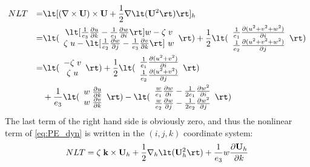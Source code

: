 \documentclass[../main/NEMO_manual]{subfiles}
\begin{document}
\begin{alignat*}{2}
  &NLT &=   &\lt[ (\nabla \times {\vect U}) \times {\vect U} + \frac{1}{2} \nabla \lt( {\vect U}^2 \rt) \rt]_h \\
  &    &=   &\lt(
    \begin{array}{*{20}c}
                \lt[ \frac{1}{e_3} \pd[u]{k} - \frac{1}{e_1} \pd[w]{i} \rt] w - \zeta \; v   \\
                \zeta \; u - \lt[ \frac{1}{e_2} \pd[w]{j} - \frac{1}{e_3} \pd[v]{k} \rt] \ w
    \end{array}
                                                                                             \rt)
          + \frac{1}{2} \lt(
	 \begin{array}{*{20}c}
                             \frac{1}{e_1} \pd[(u^2 + v^2 + w^2)]{i} \\
                             \frac{1}{e_2} \pd[(u^2 + v^2 + w^2)]{j}
    \end{array}
                                                                     \rt) \\
  &    &=   &\lt(
    \begin{array}{*{20}c}
                  -\zeta \; v \\
                   \zeta \; u
    \end{array}
                              \rt)
          + \frac{1}{2} \lt(
	 \begin{array}{*{20}c}
                             \frac{1}{e_1} \pd[(u^2 + v^2)]{i} \\
                             \frac{1}{e_2} \pd[(u^2 + v^2)]{j}
    \end{array}
                                                               \rt) \\
  &    &  &+ \frac{1}{e_3} \lt(
	 \begin{array}{*{20}c}
                                w \; \pd[u]{k} \\
                                w \; \pd[v]{k}
    \end{array}
                                               \rt)
           - \lt(
	 \begin{array}{*{20}c}
	               \frac{w}{e_1} \pd[w]{i} - \frac{1}{2 e_1} \pd[w^2]{i} \\
                  \frac{w}{e_2} \pd[w]{j} - \frac{1}{2 e_2} \pd[w^2]{j}
    \end{array}
                                                                        \rt)
\end{alignat*}
The last term of the right hand side is obviously zero, and thus the nonlinear term of
\autoref{eq:PE_dyn} is written in the $(i,j,k)$ coordinate system:
\begin{equation}
  \label{eq:PE_vector_form}
  NLT =   \zeta \; \vect k \times \vect U_h + \frac{1}{2} \nabla_h \lt( \vect U_h^2 \rt)
        + \frac{1}{e_3} w \pd[\vect U_h]{k}
\end{equation}
\end{document}
